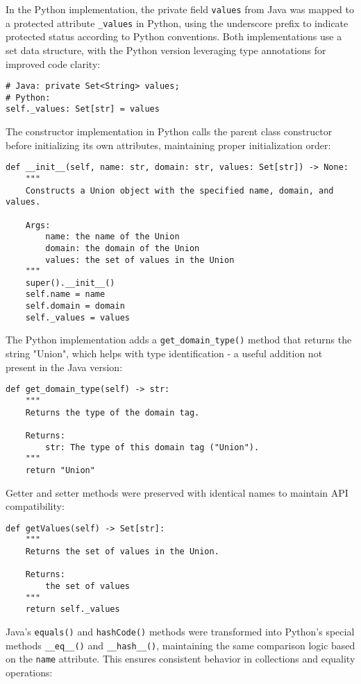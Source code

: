 \documentclass[12pt,a4paper]{article}
\begin{document}
In the Python implementation, the private field \texttt{values} from Java was mapped to a protected attribute \texttt{\_values} in Python, using the underscore prefix to indicate protected status according to Python conventions. Both implementations use a set data structure, with the Python version leveraging type annotations for improved code clarity:

\begin{verbatim}
# Java: private Set<String> values;
# Python:
self._values: Set[str] = values
\end{verbatim}

The constructor implementation in Python calls the parent class constructor before initializing its own attributes, maintaining proper initialization order:

\begin{verbatim}
def __init__(self, name: str, domain: str, values: Set[str]) -> None:
    """
    Constructs a Union object with the specified name, domain, and values.
    
    Args:
        name: the name of the Union
        domain: the domain of the Union
        values: the set of values in the Union
    """
    super().__init__()
    self.name = name
    self.domain = domain
    self._values = values
\end{verbatim}

The Python implementation adds a \texttt{get\_domain\_type()} method that returns the string "Union", which helps with type identification - a useful addition not present in the Java version:

\begin{verbatim}
def get_domain_type(self) -> str:
    """
    Returns the type of the domain tag.
    
    Returns:
        str: The type of this domain tag ("Union").
    """
    return "Union"
\end{verbatim}

Getter and setter methods were preserved with identical names to maintain API compatibility:

\begin{verbatim}
def getValues(self) -> Set[str]:
    """
    Returns the set of values in the Union.
    
    Returns:
        the set of values
    """
    return self._values
\end{verbatim}

Java's \texttt{equals()} and \texttt{hashCode()} methods were transformed into Python's special methods \texttt{\_\_eq\_\_()} and \texttt{\_\_hash\_\_()}, maintaining the same comparison logic based on the \texttt{name} attribute. This ensures consistent behavior in collections and equality operations:
\end{document}
